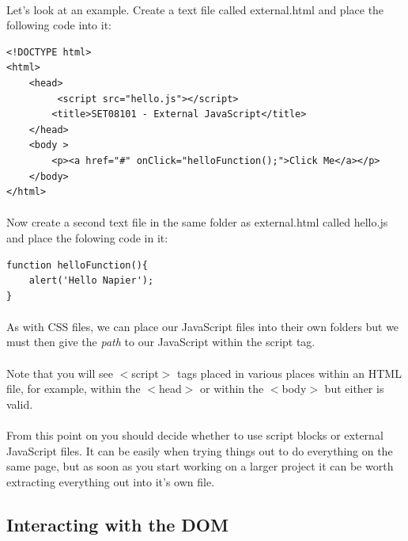 \documentclass[10pt, a4paper, twosize]{article}
\begin{document}
\paragraph{} Let's look at an example. Create a text file called external.html and place the following code into it:

\begin{lstlisting}
<!DOCTYPE html>
<html>
    <head>
         <script src="hello.js"></script> 
        <title>SET08101 - External JavaScript</title>
    </head>
    <body >
        <p><a href="#" onClick="helloFunction();">Click Me</a></p>
    </body>
</html>
\end{lstlisting}

\paragraph{} Now create a second text file in the same folder as external.html called hello.js and place the folowing code in it:

\begin{lstlisting}
function helloFunction(){ 
    alert('Hello Napier'); 
}
\end{lstlisting}

\paragraph{} As with CSS files, we can place our JavaScript files into their own folders but we must then give the \emph{path} to our JavaScript within the script tag.

\paragraph{} Note that you will see $<$script$>$ tags placed in various places within an HTML file, for example, within the $<$head$>$ or within the $<$body$>$ but either is valid.

\paragraph{} From this point on you should decide whether to use script blocks or external JavaScript files. It can be easily when trying things out to do everything on the same page, but as soon as you start working on a larger project it can be worth extracting everything out into it's own file.

\subsection{Interacting with the DOM}
\end{document}
